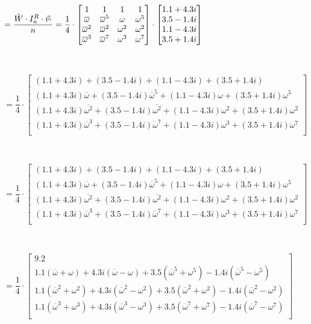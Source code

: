 $ $

$= \dfrac{\tilde W \cdot I_n^R \cdot \vec{v}_{'}}{n} = \dfrac{1}{4} \cdot\begin{bmatrix}
1 & 1 & 1 & 1\\
\overline{\omega} & \overline{\omega}^5 & \omega  & \omega^5\\
\overline{\omega}^2 & \overline{\omega}^2 & \omega^2 & \omega^2\\
\overline{\omega}^3 & \overline{\omega}^7 & \omega^3 & \omega^7\\
\end{bmatrix}
\cdot
\begin{bmatrix} 1.1 + 4.3i\\3.5 - 1.4i\\1.1 - 4.3i\\3.5 + 1.4i \end{bmatrix}$

$ $

$= \dfrac{1}{4} \cdot
\begin{bmatrix}
(1.1 + 4.3i) + (3.5 - 1.4i) + (1.1 - 4.3i) + (3.5 + 1.4i)\\
(1.1 + 4.3i)\overline{\omega} + (3.5 - 1.4i)\overline{\omega}^5 + (1.1 - 4.3i)\omega+ (3.5 + 1.4i)\omega^5 \\
(1.1 + 4.3i)\overline{\omega^2} + (3.5 - 1.4i)\overline{\omega^2} + (1.1 - 4.3i)\omega^2+ (3.5 + 1.4i)\omega^2 \\
(1.1 + 4.3i)\overline{\omega}^3 + (3.5 - 1.4i)\overline{\omega}^7 + (1.1 - 4.3i)\omega^3 + (3.5 + 1.4i)\omega^7 \\
\end{bmatrix}$

$ $

$= \dfrac{1}{4} \cdot
\begin{bmatrix}
(1.1 + 4.3i) + (3.5 - 1.4i) + (1.1 - 4.3i) + (3.5 + 1.4i)\\
(1.1 + 4.3i)\overline{\omega} + (3.5 - 1.4i)\overline{\omega}^5 + (1.1 - 4.3i)\omega+ (3.5 + 1.4i)\omega^5 \\
(1.1 + 4.3i)\overline{\omega^2} + (3.5 - 1.4i)\overline{\omega^2} + (1.1 - 4.3i)\omega^2+ (3.5 + 1.4i)\omega^2 \\
(1.1 + 4.3i)\overline{\omega}^3 + (3.5 - 1.4i)\overline{\omega}^7 + (1.1 - 4.3i)\omega^3 + (3.5 + 1.4i)\omega^7 \\
\end{bmatrix}$

$ $

$= \dfrac{1}{4} \cdot
\begin{bmatrix}
9.2\\
1.1(\overline{\omega} + \omega) + 4.3i(\overline{\omega} - \omega) +
3.5(\overline{\omega}^5 + \omega^5) - 1.4i(\overline{\omega}^5 - \omega^5)\\
1.1(\overline{\omega}^2 + {\omega}^2) + 4.3i(\overline{\omega}^2 - {\omega}^2) +
3.5(\overline{\omega}^2 + {\omega}^2) - 1.4i(\overline{\omega}^2 - {\omega}^2)\\
1.1(\overline{\omega}^3 + {\omega}^3) + 4.3i(\overline{\omega}^3 - {\omega}^3) +
3.5(\overline{\omega}^7 + {\omega}^7) - 1.4i(\overline{\omega}^7 - {\omega}^7)\\
\end{bmatrix}$

